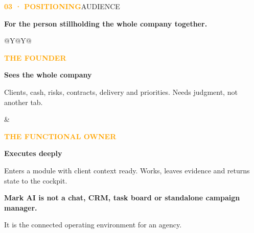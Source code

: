 \documentclass[a4paper,10pt]{article}
\newcommand{\PageLabel}[2]{\noindent\textcolor{orange}{\footnotesize\bfseries #1}\hfill\textcolor{ink!55}{\footnotesize #2}\par\vspace{5mm}}
\newcommand{\Title}[1]{{\displayfont\bfseries\fontsize{34}{38}\selectfont\color{ink}#1\par}}
\begin{document}
\PageLabel{03 · POSITIONING}{AUDIENCE}
\Title{For the person still\newline holding the whole company together.}
\vspace{6mm}
\begin{tabularx}{\textwidth}{@{}Y@{\hspace{8mm}}Y@{}}
\begin{card}\textcolor{orange}{\bfseries THE FOUNDER}\par\vspace{3mm}\displayfont\bfseries Sees the whole company\par\small Clients, cash, risks, contracts, delivery and priorities. Needs judgment, not another tab.\end{card}&
\begin{card}\textcolor{orange}{\bfseries THE FUNCTIONAL OWNER}\par\vspace{3mm}\displayfont\bfseries Executes deeply\par\small Enters a module with client context ready. Works, leaves evidence and returns state to the cockpit.\end{card}
\end{tabularx}
\vspace{7mm}
\begin{card}[colback=ink,colframe=ink]\color{white}\displayfont\bfseries\large Mark AI is not a chat, CRM, task board or standalone campaign manager.\par\vspace{2mm}\small It is the connected operating environment for an agency.\end{card}
\vfill\newpage
\end{document}
